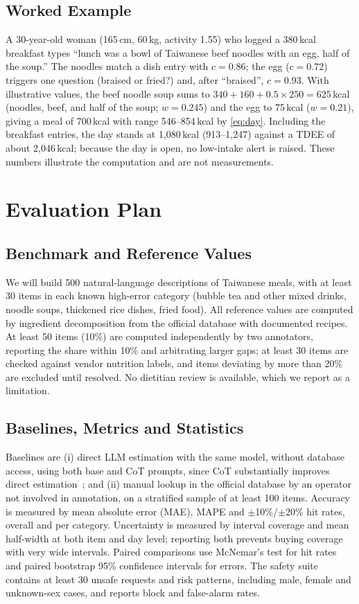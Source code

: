 \documentclass[conference]{IEEEtran}
\begin{document}
\subsection{Worked Example}
A 30-year-old woman (165\,cm, 60\,kg, activity 1.55) who logged a 380\,kcal breakfast types ``lunch was a bowl of Taiwanese beef noodles with an egg, half of the soup.'' The noodles match a dish entry with $c=0.86$; the egg ($c=0.72$) triggers one question (braised or fried?) and, after ``braised'', $c=0.93$. With illustrative values, the beef noodle soup sums to $340+160+0.5\times250=625$\,kcal (noodles, beef, and half of the soup; $w=0.245$) and the egg to 75\,kcal ($w=0.21$), giving a meal of 700\,kcal with range 546--854\,kcal by \eqref{eq:day}. Including the breakfast entries, the day stands at 1{,}080\,kcal (913--1{,}247) against a TDEE of about 2{,}046\,kcal; because the day is open, no low-intake alert is raised. These numbers illustrate the computation and are not measurements.

\section{Evaluation Plan}
\label{sec:eval}

\subsection{Benchmark and Reference Values}
We will build 500 natural-language descriptions of Taiwanese meals, with at least 30 items in each known high-error category (bubble tea and other mixed drinks, noodle soups, thickened rice dishes, fried food). All reference values are computed by ingredient decomposition from the official database with documented recipes. At least 50 items (10\%) are computed independently by two annotators, reporting the share within 10\% and arbitrating larger gaps; at least 30 items are checked against vendor nutrition labels, and items deviating by more than 20\% are excluded until resolved. No dietitian review is available, which we report as a limitation.

\subsection{Baselines, Metrics and Statistics}
Baselines are (i) direct LLM estimation with the same model, without database access, using both base and CoT prompts, since CoT substantially improves direct estimation~\cite{hua2025}; and (ii) manual lookup in the official database by an operator not involved in annotation, on a stratified sample of at least 100 items. Accuracy is measured by mean absolute error (MAE), MAPE and $\pm$10\%/$\pm$20\% hit rates, overall and per category. Uncertainty is measured by interval coverage and mean half-width at both item and day level; reporting both prevents buying coverage with very wide intervals. Paired comparisons use McNemar's test for hit rates and paired bootstrap 95\% confidence intervals for errors. The safety suite contains at least 30 unsafe requests and risk patterns, including male, female and unknown-sex cases, and reports block and false-alarm rates.
\end{document}
